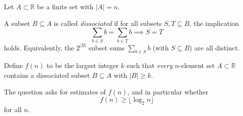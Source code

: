 Let $A\subset\mathbb R$ be a finite set with $|A|=n$.

A subset $B\subseteq A$ is called \emph{dissociated} if for all subsets $S,T\subseteq B$, the implication
\[
\sum_{b\in S} b = \sum_{b\in T} b \implies S=T
\]
holds. Equivalently, the $2^{|B|}$ subset sums $\sum_{b\in S} b$ (with $S\subseteq B$) are all distinct.

Define $f(n)$ to be the largest integer $k$ such that \emph{every} $n$-element set $A\subset\mathbb R$ contains a dissociated subset $B\subseteq A$ with $|B|\ge k$.

The question asks for estimates of $f(n)$, and in particular whether
\[
 f(n)\ge \lfloor \log_2 n\rfloor
\]
for all $n$.
